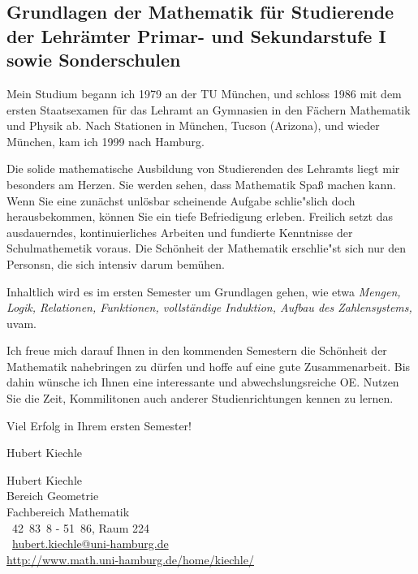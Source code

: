 \subsection{Grundlagen der Mathematik f\"ur Studierende der Lehr\"amter
Primar- und Sekundarstufe I sowie Sonderschulen} 

Mein Studium begann ich 1979 an der TU M\"unchen, und schloss 1986 mit dem
ersten Staatsexamen f\"ur das Lehramt an Gymnasien in den F\"achern Mathematik
und Physik ab. Nach Stationen in M\"unchen, Tucson (Arizona), und wieder
M\"unchen, kam ich 1999 nach Hamburg.

Die solide mathematische Ausbildung von Studierenden des Lehramts liegt mir
besonders am Herzen.  Sie werden sehen, dass Mathematik Spa\ss{} machen kann.
Wenn Sie eine zun\"achst unl\"osbar scheinende Aufgabe schlie"slich doch
herausbekommen, k\"onnen Sie ein tiefe Befriedigung erleben.  Freilich setzt
das ausdauerndes, kontinuierliches Arbeiten und fundierte Kenntnisse der
Schulmathemetik voraus. Die Sch\"onheit der Mathematik erschlie"st sich nur den
Personsn, die sich intensiv darum bem\"uhen.

Inhaltlich wird es im ersten Semester um Grundlagen gehen, wie etwa
\textit{Mengen, Logik, Relationen, Funktionen, vollst\"andige Induktion, Aufbau
des Zahlensystems,} uvam.

Ich freue mich darauf Ihnen in den kommenden Semestern die Sch\"onheit der
Mathematik nahebringen zu d\"urfen und hoffe auf eine gute Zusammenarbeit.  Bis
dahin w\"unsche ich Ihnen eine interessante und abwechslungsreiche OE. Nutzen
Sie die Zeit, Kommilitonen auch anderer Studienrichtungen kennen zu lernen.

Viel Erfolg in Ihrem ersten Semester!

\bigskip

\hfill Hubert Kiechle

Hubert Kiechle\\
Bereich Geometrie\\
Fachbereich Mathematik\\
\Telefon\ 42~83~8 - 51~86, Raum 224\\
\Letter\ \href{mailto:hubert.kiechle@uni-hamburg.de}{hubert.kiechle@uni-hamburg.de}\\
\url{http://www.math.uni-hamburg.de/home/kiechle/}
